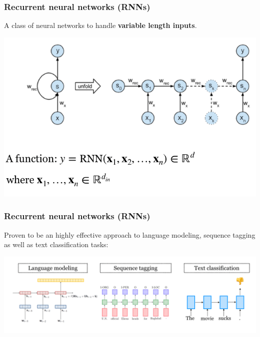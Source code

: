 \begin{frame}
\frametitle{Recurrent neural networks (RNNs)}
A class of neural networks to handle \textbf{variable length inputs}.

\centering
\includegraphics[scale=0.4]{figures/nlm/rnn.png}
\end{frame}

\begin{frame}
\frametitle{Recurrent neural networks (RNNs)}
Proven to be an highly effective approach to language modeling, sequence tagging as well as text classification tasks:

\centering
\includegraphics[scale=0.25]{figures/nlm/rnntasks.png}
\end{frame}

